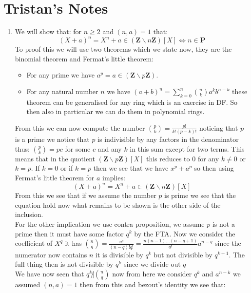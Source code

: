 \documentclass[../Main.tex]{subfiles}
\begin{document}
\section{Tristan's Notes}

\begin{enumerate}
    \item 
We will show that: for $n\geq 2$ and $(n,a)=1$ that:\\
\begin{equation} 
    (X+a)^n=X^n+a\in (\mathbf{Z}\backslash n\mathbf{Z})[X]\iff n\in \mathbf{P}
\end{equation}
To proof this we will use two theorems which we state now, they are the binomial theorem and Fermat's little theorem:
\begin{itemize}
    \item For any prime we have $a^p=a\in (\mathbf{Z}\backslash p\mathbf{Z})$.
    \item For any natural number $n$ we have $(a+b)^n=\sum_{k=0}^n \binom{n}{k}a^kb^{n-k}$ these theorem can be generalised for any ring which is an exercise in DF. So then also in particular we can do them in polynomial rings.  
\end{itemize}
From this we can now compute the number $\binom{p}{k}=\frac{p!}{k!(p-k)!}$ noticing that $p$ is a prime we notice that $p$ is indivisible by any factors in the denominator thus: $\binom{p}{k}=pc$ for some $c$ and any $k$ in this sum except for two terms. This means that in the quotient $(\mathbf{Z}\backslash p\mathbf{Z})[X]$ this reduces to $0$ for any $k\neq 0$ or $k=p$. If $k=0$ or if $k=p$ then we see that we have $x^p+a^p$ so then using Fermat's little theorem for $a$ implies:
\begin{equation}
     (X+a)^n=X^n+a\in (\mathbf{Z}\backslash n\mathbf{Z})[X]
\end{equation}
From this we see that if we assume the number $p$ is prime we see that the equation hold now what remains to be shown is the other side of the inclusion. \\
For the other implication we use contra proposition, we assume $p$ is not a prime then it must have some factor $q^k$ by the FTA. Now we consider the coefficient of $X^q$ it has $\binom{n}{q}=\frac{n!}{(n-q)!q!}=\frac{n(n-1)...(n-q+1)}{q!}a^{n-q}$ since the numerator now contains $n$ it is divisible by $q^k$ but not divisible by $q^{k+1}$. The full thing then is not divisible by $q^k$ since we divide out $q$\\
We have now seen that $q^k\not|\binom{n}{q}$ now from here we consider $q^k$ and $a^{n-k}$ we assumed $(n,a)=1$ then from this and bezout's identity we see that:

\end{enumerate}
\end{document}
